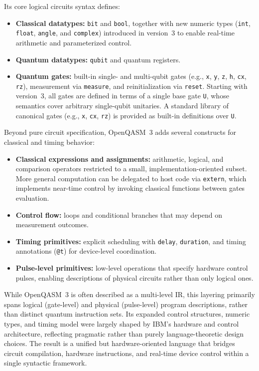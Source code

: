 Its core logical circuits syntax defines:
\begin{itemize}
  \item \textbf{Classical datatypes:} \texttt{bit} and \texttt{bool}, together with new numeric types (\texttt{int}, \texttt{float}, \texttt{angle}, and \texttt{complex}) introduced in version~3 to enable real-time arithmetic and parameterized control.
  \item \textbf{Quantum datatypes:} \texttt{qubit} and quantum registers.
  \item \textbf{Quantum gates:} built-in single- and multi-qubit gates (e.g., \texttt{x}, \texttt{y}, \texttt{z}, \texttt{h}, \texttt{cx}, \texttt{rz}), measurement via \texttt{measure}, and reinitialization via \texttt{reset}.
  Starting with version~3, all gates are defined in terms of a single base gate \texttt{U}, whose semantics cover arbitrary single-qubit unitaries.  
  A standard library of canonical gates (e.g., \texttt{x}, \texttt{cx}, \texttt{rz}) is provided as built-in definitions over \texttt{U}.
\end{itemize}

Beyond pure circuit specification, OpenQASM~3 adds several constructs for classical and timing behavior:
\begin{itemize}
  \item \textbf{Classical expressions and assignments:} arithmetic, logical, and comparison operators restricted to a small, implementation-oriented subset. More general computation can be delegated to host code via \texttt{extern}, which implements near-time control by invoking classical functions between gates evaluation.
  \item \textbf{Control flow:} loops and conditional branches that may depend on measurement outcomes.
  \item \textbf{Timing primitives:} explicit scheduling with \texttt{delay}, \texttt{duration}, and timing annotations (\texttt{@t}) for device-level coordination.
  \item \textbf{Pulse-level primitives:} low-level operations that specify hardware control pulses, enabling descriptions of physical circuits rather than only logical ones.
\end{itemize}

While OpenQASM~3 is often described as a multi-level IR, this layering primarily spans logical (gate-level) and physical (pulse-level) program descriptions, rather than distinct quantum instruction sets.  
Its expanded control structures, numeric types, and timing model were largely shaped by IBM’s hardware and control architecture, reflecting pragmatic rather than purely language-theoretic design choices.  
The result is a unified but hardware-oriented language that bridges circuit compilation, hardware instructions, and real-time device control within a single syntactic framework.




